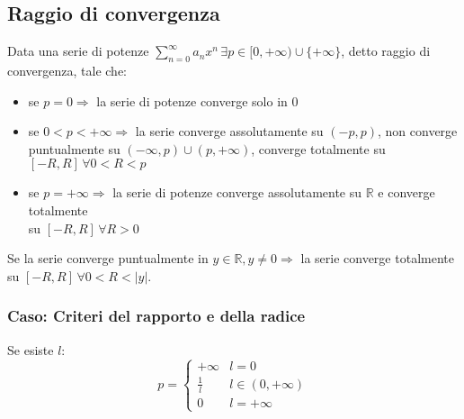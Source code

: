 \documentclass[12pt, a4paper]{article}
\begin{document}
    \subsection{Raggio di convergenza}
        Data una serie di potenze $\sum_{n=0}^{\infty}a_n x^n \, \exists p \in [0,+\infty)\cup\{+\infty\}$, detto raggio di convergenza, tale che:
        \begin{itemize}
            \item se $p=0 \Rightarrow$ la serie di potenze converge solo in 0
            \item se $0<p<+\infty \Rightarrow$ la serie converge assolutamente su $(-p,p)$, non converge puntualmente su $(-\infty,p)\cup(p,+\infty)$, converge totalmente su $[-R,R] \,\forall 0<R<p$
            \item se $p=+\infty \Rightarrow$ la serie di potenze converge assolutamente su $\mathbb{R}$ e converge totalmente\\
            su $[-R,R] \, \forall R>0$
        \end{itemize}
        Se la serie converge puntualmente in $y\in\mathbb{R}, y\neq 0 \Rightarrow$ la serie converge totalmente su $[-R,R]\, \forall 0<R<\left|y\right|$.
        \subsubsection{Caso: Criteri del rapporto e della radice}
            Se esiste $l$:
            \begin{equation*}
                p=\begin{cases}
                    +\infty & l = 0\\
                    \frac{1}{l} & l\in(0,+\infty)\\
                    0  & l = +\infty
                \end{cases}
            \end{equation*}
\end{document}
